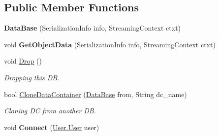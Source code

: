 \subsection*{Public Member Functions}
\begin{DoxyCompactItemize}
\item 
\hypertarget{class_dwarf_d_b_1_1_data_structures_1_1_data_base_a9748f9609030f61d1cfc28a162a48ad5}{
{\bfseries DataBase} (SerializationInfo info, StreamingContext ctxt)}
\label{class_dwarf_d_b_1_1_data_structures_1_1_data_base_a9748f9609030f61d1cfc28a162a48ad5}

\item 
\hypertarget{class_dwarf_d_b_1_1_data_structures_1_1_data_base_a34980ba6f61e15d6dcbe5af7f596a6fd}{
void {\bfseries GetObjectData} (SerializationInfo info, StreamingContext ctxt)}
\label{class_dwarf_d_b_1_1_data_structures_1_1_data_base_a34980ba6f61e15d6dcbe5af7f596a6fd}

\item 
void \hyperlink{class_dwarf_d_b_1_1_data_structures_1_1_data_base_ae169105e97a66c5d621b3d945d11fce4}{Drop} ()
\begin{DoxyCompactList}\small\item\em Dropping this DB. \item\end{DoxyCompactList}\item 
bool \hyperlink{class_dwarf_d_b_1_1_data_structures_1_1_data_base_af1cedf55fdab7efe9154ea7570c9abc9}{CloneDataContainer} (\hyperlink{class_dwarf_d_b_1_1_data_structures_1_1_data_base}{DataBase} from, String dc\_\-name)
\begin{DoxyCompactList}\small\item\em Cloning DC from another DB. \item\end{DoxyCompactList}\item 
\hypertarget{class_dwarf_d_b_1_1_data_structures_1_1_data_base_ae0180400ee59265e19a5d981f59ca440}{
void {\bfseries Connect} (\hyperlink{class_dwarf_d_b_1_1_user_1_1_user}{User.User} user)}
\label{class_dwarf_d_b_1_1_data_structures_1_1_data_base_ae0180400ee59265e19a5d981f59ca440}


\end{DoxyCompactItemize}
